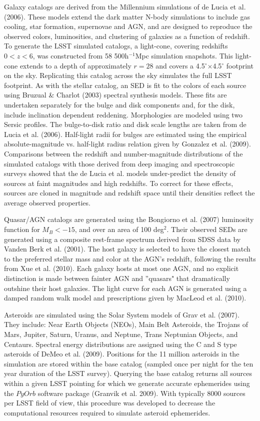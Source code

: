\documentclass{emulateapj}
\begin{document}
{Galaxy catalogs are derived from the Millennium simulations of de Lucia et al. (2006).  These models extend the dark matter N-body simulations to include gas cooling, star formation, supernovae and AGN, and are designed to reproduce the observed colors, luminosities, and clustering of galaxies as a function of redshift. To generate the LSST simulated catalogs, a light-cone, covering redshifts $0<z<6$, was constructed from 58 500h$^{-1}$Mpc simulation snapshots. This light-cone extends to a depth of approximately $r=28$ and covers a 4.5$^\circ$$\times$4.5$^\circ$ footprint on the sky. Replicating this catalog across the sky simulates the full LSST footprint. As with the 
stellar catalog, an SED is fit to the colors of each source using Bruzual \& Charlot (2003) spectral synthesis models. These fits are undertaken separately for the bulge and disk components and, for the disk, include inclination dependent reddening. Morphologies are modeled using two Sersic profiles. The bulge-to-disk ratio and disk scale lengths are taken from de Lucia et al. (2006). Half-light radii 
for bulges are estimated using the empirical absolute-magnitude vs. half-light radius relation given by Gonzalez et al. (2009). Comparisons between the redshift and number-magnitude distributions of the simulated catalogs with those derived from deep imaging and spectroscopic surveys showed that the de Lucia et al. models under-predict the density of sources at faint magnitudes and high 
redshifts. To correct for these effects, sources are cloned in magnitude and redshift space until their densities reflect the average observed properties.

Quasar/AGN catalogs are generated using the Bongiorno et al. (2007) luminosity function for $M_B < -15$, and over an area of 
100 deg$^2$. Their observed SEDs are generated using a composite rest-frame spectrum derived from SDSS data by 
Vanden Berk et al. (2001). The host galaxy is selected to have the closest match to the preferred stellar mass and color at
the AGN's redshift, following the results from Xue et al. (2010).  Each galaxy hosts at most one AGN, and no explicit distinction 
is made between fainter AGN and ''quasars" that dramatically outshine their host galaxies. The light curve for each AGN is 
generated using a damped random walk model and prescriptions given by MacLeod et al. (2010).

Asteroids are simulated using the Solar System models of Grav et al. (2007). They include: Near Earth Objects (NEOs), Main Belt Asteroids, the Trojans of Mars, Jupiter, Saturn, Uranus, and Neptune, Trans Neptunian Objects, and Centaurs. Spectral energy distributions are assigned using the C and S type asteroids of DeMeo et al. (2009). Positions for the 11 million asteroids in the simulation are stored within the base catalog (sampled once per night for the ten year duration of the LSST survey). Querying the base catalog returns all sources within a given LSST pointing for which we generate accurate ephemerides using the $PyOrb$ software package (Granvik et al. 2009). With 
typically 8000 sources per LSST field of view, this procedure was developed to decrease the computational resources required to simulate asteroid ephemerides.



}
\end{document}
